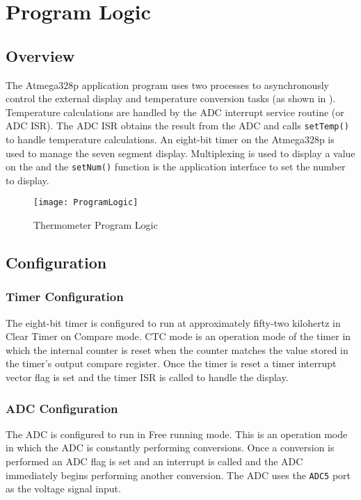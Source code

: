 \documentclass[main.tex]{subfiles}
\begin{document}
\chapter{Program Logic} 
	\section{Overview}
	The Atmega328p application program uses two processes to asynchronously
	control the external display and temperature conversion tasks (as shown in
	).	Temperature calculations are handled by the ADC
	interrupt service routine (or ADC ISR). The ADC ISR obtains the result from
	the ADC and calls \lstinline{setTemp()} to handle temperature calculations.
	An eight-bit timer on the Atmega328p is used to manage the seven segment
	display.  Multiplexing is used to display a value on the and the
	\lstinline{setNum()} function is the application interface to set the number
	to display. 
	
	\begin{figure}[H]
		\begin{center}
			\texttt{[image: ProgramLogic]}
		\end{center}
		\caption{Thermometer Program Logic}
		\label{fig:progLogic}
	\end{figure}

	\section{Configuration}
		\subsection{Timer Configuration}
		The eight-bit timer is configured to run at approximately fifty-two kilohertz
		in Clear Timer on Compare mode. CTC mode is an operation mode of the timer in
		which the internal counter is reset when the counter matches the value stored
		in the timer's output compare register. Once the timer is reset a timer
		interrupt vector flag is set and the timer ISR is called to handle the display.

		\subsection{ADC Configuration}
		The ADC is configured to run in Free running mode. This is an operation mode
		in which the ADC is constantly performing conversions. Once a conversion is
		performed an ADC flag is set and an interrupt is called and the ADC
		immediately begins performing another conversion. The ADC uses the
		\lstinline{ADC5} port as the voltage signal input. 
\end{document}

